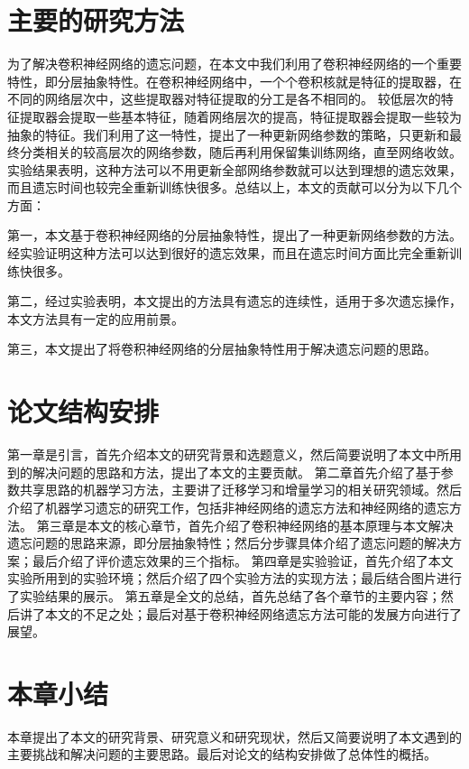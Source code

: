 \section{主要的研究方法}
为了解决卷积神经网络的遗忘问题，在本文中我们利用了卷积神经网络的一个重要特性，即分层抽象特性。在卷积神经网络中，一个个卷积核就是特征的提取器，在不同的网络层次中，这些提取器对特征提取的分工是各不相同的。
较低层次的特征提取器会提取一些基本特征，随着网络层次的提高，特征提取器会提取一些较为抽象的特征。我们利用了这一特性，提出了一种更新网络参数的策略，只更新和最终分类相关的较高层次的网络参数，随后再利用保留集训练网络，直至网络收敛。
实验结果表明，这种方法可以不用更新全部网络参数就可以达到理想的遗忘效果，而且遗忘时间也较完全重新训练快很多。总结以上，本文的贡献可以分为以下几个方面：

第一，本文基于卷积神经网络的分层抽象特性，提出了一种更新网络参数的方法。经实验证明这种方法可以达到很好的遗忘效果，而且在遗忘时间方面比完全重新训练快很多。

第二，经过实验表明，本文提出的方法具有遗忘的连续性，适用于多次遗忘操作，本文方法具有一定的应用前景。

第三，本文提出了将卷积神经网络的分层抽象特性用于解决遗忘问题的思路。

\section{论文结构安排}
第一章是引言，首先介绍本文的研究背景和选题意义，然后简要说明了本文中所用到的解决问题的思路和方法，提出了本文的主要贡献。
第二章首先介绍了基于参数共享思路的机器学习方法，主要讲了迁移学习和增量学习的相关研究领域。然后介绍了机器学习遗忘的研究工作，包括非神经网络的遗忘方法和神经网络的遗忘方法。
第三章是本文的核心章节，首先介绍了卷积神经网络的基本原理与本文解决遗忘问题的思路来源，即分层抽象特性；然后分步骤具体介绍了遗忘问题的解决方案；最后介绍了评价遗忘效果的三个指标。
第四章是实验验证，首先介绍了本文实验所用到的实验环境；然后介绍了四个实验方法的实现方法；最后结合图片进行了实验结果的展示。
第五章是全文的总结，首先总结了各个章节的主要内容；然后讲了本文的不足之处；最后对基于卷积神经网络遗忘方法可能的发展方向进行了展望。
\section{本章小结}
本章提出了本文的研究背景、研究意义和研究现状，然后又简要说明了本文遇到的主要挑战和解决问题的主要思路。最后对论文的结构安排做了总体性的概括。
